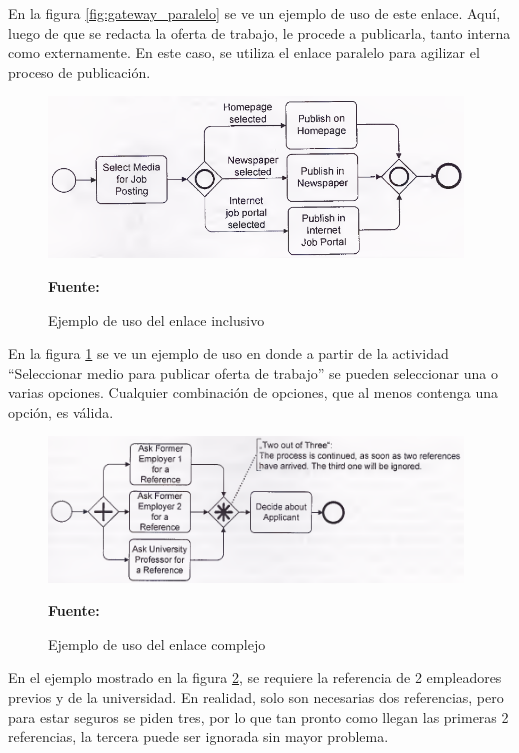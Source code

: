 En la figura \ref{fig:gateway_paralelo} se ve un ejemplo de uso de este enlace. Aquí, luego de que se redacta la oferta de trabajo, le procede a publicarla, tanto interna como externamente. En este caso, se utiliza el enlace paralelo para agilizar el proceso de publicación.

\begin{figure}[!htb]
  \begin{center}
    \includegraphics[width=11cm]{./imagenes/gateway_inclusivo.png}
    \caption{Ejemplo de uso del enlace inclusivo}
    \label{fig:gateway_inclusivo}
    \textbf{Fuente:}  \cite{bpmn2}
  \end{center}
\end{figure}


En la figura \ref{fig:gateway_inclusivo} se ve un ejemplo de uso en donde a partir de la actividad ``Seleccionar medio para publicar oferta de trabajo'' se pueden seleccionar una o varias opciones. Cualquier combinación de opciones, que al menos contenga una opción, es válida.

\begin{figure}[!htb]
  \begin{center}
    \includegraphics[width=11cm]{./imagenes/gateway_complejo.png}
    \caption{Ejemplo de uso del enlace complejo}
    \label{fig:gateway_complejo}
    \textbf{Fuente:}  \cite{bpmn2}
  \end{center}
\end{figure}


En el ejemplo mostrado en la figura \ref{fig:gateway_complejo}, se requiere la referencia de 2 empleadores previos y de la universidad. En realidad, solo son necesarias dos referencias, pero para estar seguros se piden tres, por lo que tan pronto como llegan las primeras 2 referencias, la tercera puede ser ignorada sin mayor problema.


